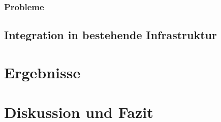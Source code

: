 \documentclass[a4paper, 12pt, oneside]{scrbook}
\begin{document}
		\subsection{Probleme}
	
	\section{Integration in bestehende Infrastruktur}
	
	
	\chapter{Ergebnisse}
	
	
	
	
	\chapter{Diskussion und Fazit}
	
	
	\frontmatter
	\printbibliography
\end{document}
